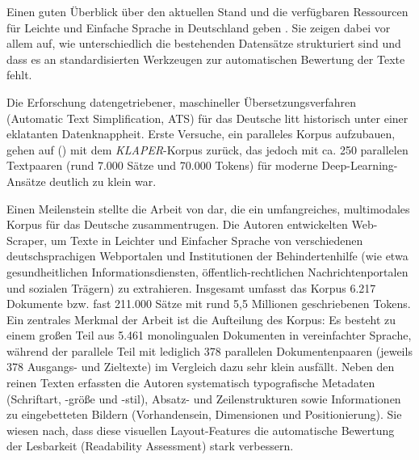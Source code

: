 Einen guten Überblick über den aktuellen Stand und die verfügbaren Ressourcen für Leichte und Einfache Sprache in Deutschland geben \citet{madina2023easy}. Sie zeigen dabei vor allem auf, wie unterschiedlich die bestehenden Datensätze strukturiert sind und dass es an standardisierten Werkzeugen zur automatischen Bewertung der Texte fehlt.

Die Erforschung datengetriebener, maschineller Übersetzungsverfahren (Automatic Text Simplification, ATS) für das Deutsche litt historisch unter einer eklatanten Datenknappheit. Erste Versuche, ein paralleles Korpus aufzubauen, gehen auf \citeauthor{klaper2013klaper} (\citeyear{klaper2013klaper}) mit dem \textit{KLAPER}-Korpus zurück, das jedoch mit ca. 250 parallelen Textpaaren (rund 7.000 Sätze und 70.000 Tokens) für moderne Deep-Learning-Ansätze deutlich zu klein war. 

Einen Meilenstein stellte die Arbeit von \citet{battisti2020corpus} dar, die ein umfangreiches, multimodales Korpus für das Deutsche zusammentrugen. Die Autoren entwickelten Web-Scraper, um Texte in Leichter und Einfacher Sprache von verschiedenen deutschsprachigen Webportalen und Institutionen der Behindertenhilfe (wie etwa gesundheitlichen Informationsdiensten, öffentlich-rechtlichen Nachrichtenportalen und sozialen Trägern) zu extrahieren. Insgesamt umfasst das Korpus 6.217 Dokumente bzw. fast 211.000 Sätze mit rund 5,5 Millionen geschriebenen Tokens. Ein zentrales Merkmal der Arbeit ist die Aufteilung des Korpus: Es besteht zu einem großen Teil aus 5.461 monolingualen Dokumenten in vereinfachter Sprache, während der parallele Teil mit lediglich 378 parallelen Dokumentenpaaren (jeweils 378 Ausgangs- und Zieltexte) im Vergleich dazu sehr klein ausfällt. Neben den reinen Texten erfassten die Autoren systematisch typografische Metadaten (Schriftart, -größe und -stil), Absatz- und Zeilenstrukturen sowie Informationen zu eingebetteten Bildern (Vorhandensein, Dimensionen und Positionierung). Sie wiesen nach, dass diese visuellen Layout-Features die automatische Bewertung der Lesbarkeit (Readability Assessment) stark verbessern.

